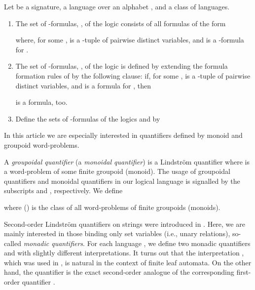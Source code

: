 \documentclass{LMCS}
\begin{document}
\begin{defi}Let  be a signature,    a language over an alphabet , and  a class of languages.
\begin{enumerate}[]
\item The set of -formulas, , of the logic  consists of all formulas of the form
 
where, for some ,  is a -tuple of pairwise distinct variables, and   is a -formula for .

\item The set of -formulas,  ,  of the logic   is defined by extending the formula formation rules of   by the following clause:
if, for some ,  is a -tuple of pairwise distinct  variables, and  is a formula for , then 
 
is a formula, too.
\item Define the sets of -formulas of the logics  and  by

\end{enumerate}
\end{defi}
\noindent
In this article we are especially interested in quantifiers defined by monoid and groupoid word-problems.
\begin{defi}\label{grpmon}
A {\em groupoidal quantifier\/} ({a \em monoidal quantifier\/}) is a Lindstr{\"o}m quantifier 
where  is a word-problem of some finite groupoid (monoid).
The usage of groupoidal quantifiers and monoidal quantifiers in our logical language is signalled by the subscripts  and , respectively. We define 

where  () is the class of all  word-problems of finite groupoids (monoids).   
\end{defi}

 Second-order Lindstr{\"o}m quantifiers on strings were introduced in
\cite{buvo98}. Here, we are mainly interested in those binding only
set variables (i.e., unary relations), so-called \emph{monadic quantifiers}. For each language ,
we define two monadic quantifiers  and  with slightly different
interpretations. It turns out that the interpretation , which was used in \cite{MR1908783},
is natural in the context of finite leaf automata. On the other hand, the quantifier
 is the exact second-order analogue of the corresponding first-order quantifier .
\end{document}
